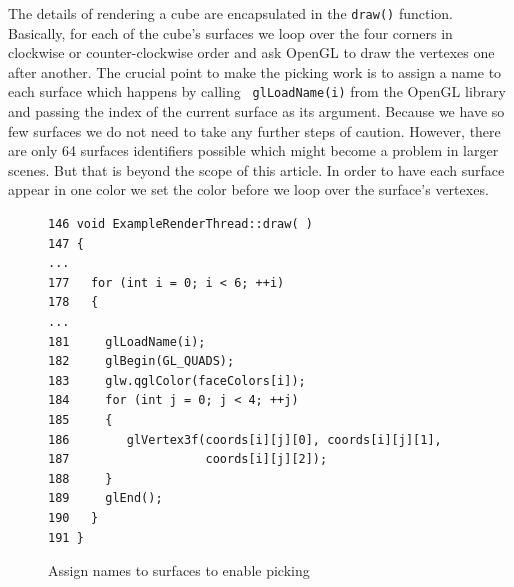 \documentclass[jou,noapacite]{apa}
\begin{document}
The details of rendering a cube are encapsulated in the \lstinline|draw()|
function.
%
Basically, for each of the cube's surfaces we loop over the four corners in
clockwise or counter-clockwise order and ask OpenGL to draw the vertexes one
after another.
%
The crucial point to make the picking work is to assign a name to each surface
which happens by calling \lstinline| glLoadName(i)| from the OpenGL library and
passing the index of the current surface as its argument.
%
Because we have so few surfaces we do not need to take any further steps of
caution.
%
However, there are only 64 surfaces identifiers possible which might become a
problem in larger scenes.
%
But that is beyond the scope of this article.
%
In order to have each surface appear in one color we set the color before we
loop over the surface's vertexes.
\begin{figure}[h]
\begin{lstlisting}[basicstyle=\scriptsize]
146 void ExampleRenderThread::draw( )
147 {
...
177   for (int i = 0; i < 6; ++i)
178   {
...
181     glLoadName(i);
182     glBegin(GL_QUADS);
183     glw.qglColor(faceColors[i]);
184     for (int j = 0; j < 4; ++j)
185     {
186        glVertex3f(coords[i][j][0], coords[i][j][1],
187                   coords[i][j][2]);
188     }
189     glEnd();
190   }
191 }
\end{lstlisting}
\caption{Assign names to surfaces to enable picking}
\end{figure}
\end{document}
